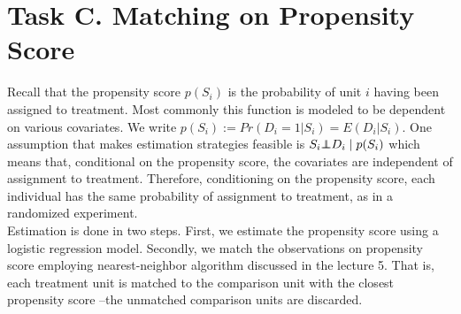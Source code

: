 \section*{Task C. Matching on Propensity Score}

Recall that the propensity score $p(S_i)$ is the probability of unit $i$ having been assigned to treatment. Most commonly this function is modeled to be dependent on various covariates. We write $p(S_i) := Pr(D_i = 1|S_i) = E(D_i|S_i)$. One assumption that makes estimation strategies feasible is $S_i {\perp\hspace{-7pt}\perp} D_i \mid p(S_i)$ which means that, conditional on the propensity score, the covariates are independent of assignment to treatment. Therefore, conditioning on the propensity score, each individual has the same probability of assignment to treatment, as in a randomized experiment. \\

\noindent Estimation is done in two steps. First, we estimate the propensity score using a logistic regression model. Secondly, we match the observations on propensity score employing nearest-neighbor algorithm discussed in the lecture 5. That is, each treatment unit is matched to the comparison unit with the closest propensity score --the unmatched comparison units are discarded. 

